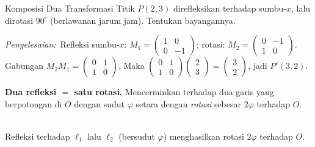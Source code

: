 \documentclass[11pt,a4paper]{report}
\theoremstyle{gaya}
\newcommand{\jawab}{\par\smallskip\noindent\textit{\textcolor{oranye}{Penyelesaian:}}\ }
\begin{document}
\begin{contoh}{Komposisi Dua Transformasi}
Titik $P(2,3)$ direfleksikan terhadap sumbu-$x$, lalu dirotasi $90^\circ$ (berlawanan jarum jam). Tentukan bayangannya.

\jawab Refleksi sumbu-$x$: $M_1=\begin{pmatrix}1&0\\0&-1\end{pmatrix}$; rotasi: $M_2=\begin{pmatrix}0&-1\\1&0\end{pmatrix}$. Gabungan $M_2M_1=\begin{pmatrix}0&1\\1&0\end{pmatrix}$. Maka $\begin{pmatrix}0&1\\1&0\end{pmatrix}\begin{pmatrix}2\\3\end{pmatrix}=\begin{pmatrix}3\\2\end{pmatrix}$, jadi $P'(3,2)$.
\end{contoh}

\smallskip\noindent\textbf{Dua refleksi $=$ satu rotasi.} Mencerminkan terhadap dua garis yang berpotongan di $O$ dengan sudut $\varphi$ setara dengan \emph{rotasi} sebesar $2\varphi$ terhadap $O$.
\begin{center}
\\
\small Refleksi terhadap $\ell_1$ lalu $\ell_2$ (bersudut $\varphi$) menghasilkan rotasi $2\varphi$ terhadap $O$.
\end{center}
\end{document}
